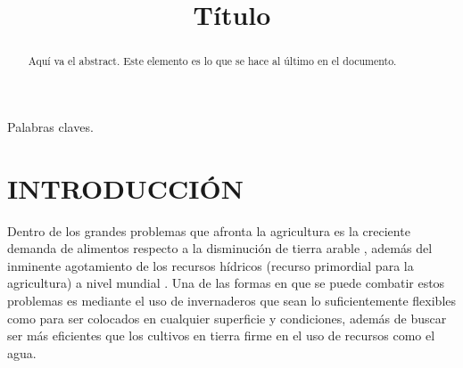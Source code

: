 \documentclass[letterpaper,conference]{IEEEtran}
\begin{document}
\title{Título}

\author{
\and
{}
}

\maketitle

\thispagestyle{plain}
\pagestyle{plain}

\begin{abstract}
Aquí va el abstract. Este elemento es lo que se hace al último en el documento.
\\ 

\end{abstract}
\begin{IEEEkeywords}
Palabras claves.
\end{IEEEkeywords}

\IEEEpeerreviewmaketitle

\section{INTRODUCCIÓN}



Dentro de los grandes problemas que afronta la agricultura es la creciente demanda de alimentos respecto a la disminución de tierra arable \textcite{Specht2014}, además del inminente agotamiento de los recursos hídricos (recurso primordial para la agricultura) a nivel mundial  \parencite{Baldos2016}. Una de las formas en que se puede combatir estos problemas es mediante el uso de invernaderos que sean lo suficientemente flexibles como para ser colocados en cualquier superficie y condiciones, además de buscar ser más eficientes que los cultivos en tierra firme en el uso de recursos como el agua.
\end{document}
